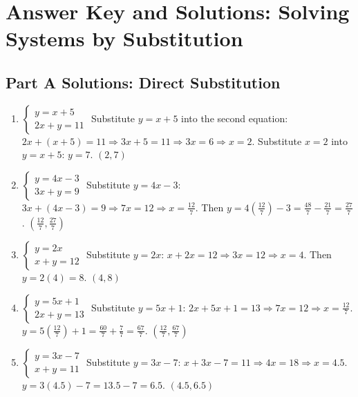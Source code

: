 \documentclass[12pt]{article}
\begin{document}
\newpage


\section*{Answer Key and Solutions: Solving Systems by Substitution}

\subsection*{Part A Solutions: Direct Substitution}
\begin{enumerate}
    \item \(\begin{cases} y = x + 5 \\ 2x + y = 11 \end{cases}\)  
    Substitute \(y = x + 5\) into the second equation:  
    \(2x + (x + 5) = 11 \Rightarrow 3x + 5 = 11 \Rightarrow 3x = 6 \Rightarrow x = 2\).  
    Substitute \(x = 2\) into \(y = x + 5\): \(y = 7\).  
    \(\boxed{(2, 7)}\)

    \item \(\begin{cases} y = 4x - 3 \\ 3x + y = 9 \end{cases}\)  
    Substitute \(y = 4x - 3\): \(3x + (4x - 3) = 9 \Rightarrow 7x = 12 \Rightarrow x = \tfrac{12}{7}\).  
    Then \(y = 4(\tfrac{12}{7}) - 3 = \tfrac{48}{7} - \tfrac{21}{7} = \tfrac{27}{7}\).  
    \(\boxed{(\tfrac{12}{7}, \tfrac{27}{7})}\)

    \item \(\begin{cases} y = 2x \\ x + y = 12 \end{cases}\)  
    Substitute \(y = 2x\): \(x + 2x = 12 \Rightarrow 3x = 12 \Rightarrow x = 4\).  
    Then \(y = 2(4) = 8\).  
    \(\boxed{(4, 8)}\)

    \item \(\begin{cases} y = 5x + 1 \\ 2x + y = 13 \end{cases}\)  
    Substitute \(y = 5x + 1\): \(2x + 5x + 1 = 13 \Rightarrow 7x = 12 \Rightarrow x = \tfrac{12}{7}\).  
    \(y = 5(\tfrac{12}{7}) + 1 = \tfrac{60}{7} + \tfrac{7}{7} = \tfrac{67}{7}\).  
    \(\boxed{(\tfrac{12}{7}, \tfrac{67}{7})}\)

    \item \(\begin{cases} y = 3x - 7 \\ x + y = 11 \end{cases}\)  
    Substitute \(y = 3x - 7\): \(x + 3x - 7 = 11 \Rightarrow 4x = 18 \Rightarrow x = 4.5\).  
    \(y = 3(4.5) - 7 = 13.5 - 7 = 6.5\).  
    \(\boxed{(4.5, 6.5)}\)
\end{enumerate}
\end{document}
